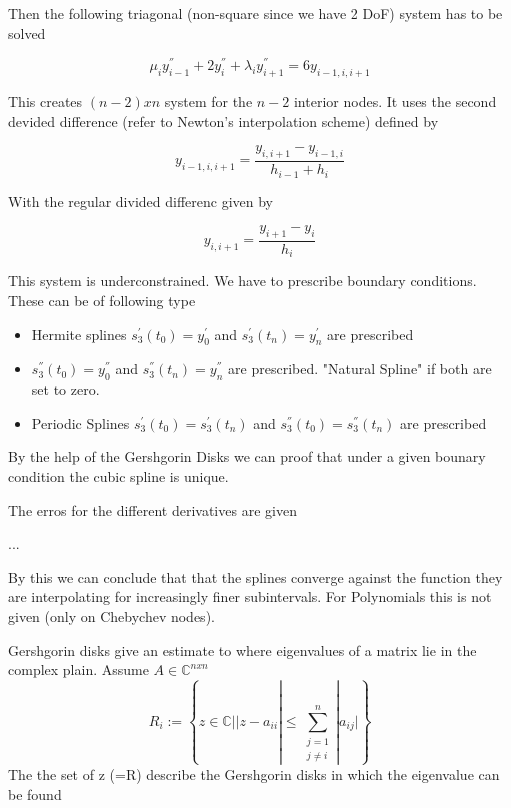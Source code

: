 \documentclass[
    a4paper,
    11pt
]{article}
\begin{document}
Then the following triagonal (non-square since we have 2 DoF) system has to be
solved

\begin{equation}
    \mu_i y_{i-1}^{''} + 2y_i^{''} + \lambda_i y_{i+1}^{''} = 6 y_{i-1,i,i+1}
\end{equation}

This creates $(n-2) x n$ system for the $n-2$ interior nodes. It uses the second
devided difference (refer to Newton's interpolation scheme) defined by

\begin{equation}
    y_{i-1,i,i+1} = \frac{y_{i,i+1} - y_{i-1,i}}{h_{i-1} + h_i}
\end{equation}

With the regular divided differenc given by

\begin{equation}
    y_{i, i+1} = \frac{y_{i+1} - y_i}{h_{i}}
\end{equation}

This system is underconstrained. We have to prescribe boundary conditions. These
can be of following type

\begin{itemize}
    \item Hermite splines $s_3^{'}(t_0) = y_0^{'}$ and $s_3^{'}(t_n) = y_n^{'}$ are
        prescribed
    \item $s_3^{''}(t_0) = y_0^{''}$ and $s_3^{''}(t_n) = y_n^{''}$ are
        prescribed. "Natural Spline" if both are set to zero.
    \item Periodic Splines $s_3^{'}(t_0) = s_3^{'}(t_n)$ and $s_3^{''}(t_0) =
        s_3^{''}(t_n)$ are prescribed
\end{itemize}

By the help of the Gershgorin Disks we can proof that under a given bounary
condition the cubic spline is unique.

The erros for the different derivatives are given

...

By this we can conclude that that the splines converge against the function they
are interpolating for increasingly finer subintervals. For Polynomials this is
not given (only on Chebychev nodes).

\hrulefill

Gershgorin disks give an estimate to where eigenvalues of a matrix lie in the
complex plain. Assume $A \in \mathbb{C}^{n x n}$
\begin{equation}
    R_i := \left\{z \in{} \mathbb{C} |
    |z - a_{ii}| \leq{} \sum_{\substack{j=1 \\ j\neq{} i}}^{n}|a_{ij}| \right\}
\end{equation}
The the set of z (=R) describe the Gershgorin disks in which the eigenvalue can
be found
\end{document}
